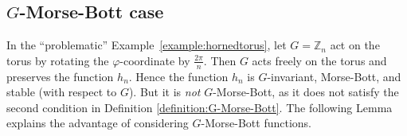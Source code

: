 \documentclass[11pt]{amsart}
\theoremstyle{definition}
\numberwithin{equation}{subsection}
\newcommand{\ZZ}{\mathbb{Z}}
\begin{document}
\subsection{\texorpdfstring{$G$-Morse-Bott case}{G-Morse-Bott case}}



In the ``problematic'' Example~\ref{example:hornedtorus}, let $G= \ZZ_n$ act on the torus by rotating the $\varphi$-coordinate by $\frac{2\pi}{n}$. Then $G$ acts freely on the torus and preserves the function $h_n$.
Hence the function $h_n$ is $G$-invariant, Morse-Bott, and stable (with respect to $G$).
But it is \emph{not} $G$-Morse-Bott, as it does not satisfy the second condition in Definition \ref{definition:G-Morse-Bott}.
The following Lemma explains the advantage of considering $G$-Morse-Bott functions. 
\end{document}
